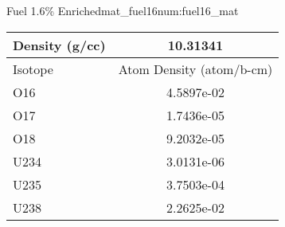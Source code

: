 \begin{matitem}{Fuel 1.6\% Enriched}{mat_fuel16}{num:fuel16_mat}
  \centering
  \begin{tabular}{l c}
    \toprule
    Density (g/cc) & 10.31341 \\
    \midrule
    Isotope & Atom Density (atom/b-cm) \\
    \midrule
    \midrule
O16 & 4.5897e-02 \\
O17 & 1.7436e-05 \\
O18 & 9.2032e-05 \\
U234 & 3.0131e-06 \\
U235 & 3.7503e-04 \\
U238 & 2.2625e-02 \\

    \bottomrule
  \end{tabular}
\end{matitem}
